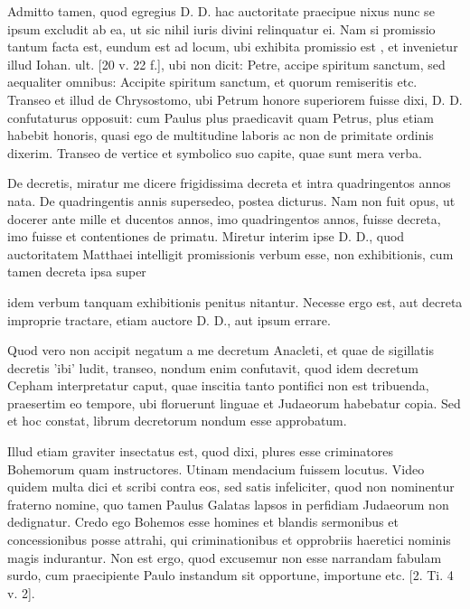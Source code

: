 Admitto tamen, quod egregius D. D. hac auctoritate praecipue nixus nunc se ipsum excludit ab ea, ut sic nihil iuris divini relinquatur ei. Nam si promissio tantum facta est, eundum est ad locum, ubi exhibita promissio est \marginpar{\small[287]}, et invenietur illud Iohan. ult. [20 v. 22 f.], ubi non dicit: Petre, accipe spiritum sanctum, sed aequaliter omnibus: Accipite spiritum sanctum, et quorum remiseritis etc. Transeo et illud de Chrysostomo, ubi Petrum honore superiorem fuisse dixi, D. D. confutaturus opposuit: cum Paulus plus praedicavit quam Petrus, plus etiam habebit honoris, quasi ego de multitudine laboris ac non de primitate ordinis dixerim. Transeo de vertice et symbolico suo capite, quae sunt mera verba.

De decretis, miratur me dicere frigidissima decreta et intra quadringentos annos nata. De quadringentis annis supersedeo, postea dicturus. Nam non fuit opus, ut docerer ante mille et ducentos annos, imo quadringentos annos, fuisse decreta, imo fuisse et contentiones de primatu. Miretur interim ipse D. D., quod auctoritatem Matthaei intelligit promissionis verbum esse, non exhibitionis, cum tamen decreta ipsa super

idem verbum tanquam exhibitionis penitus nitantur. Necesse ergo est, aut decreta improprie tractare, etiam auctore D. D., aut ipsum errare.

Quod vero non accipit negatum a me decretum Anacleti, et quae de sigillatis decretis 'ibi' ludit, transeo, nondum enim confutavit, quod idem decretum Cepham interpretatur caput, quae inscitia tanto pontifici non est tribuenda, praesertim eo tempore, ubi floruerunt linguae et Judaeorum habebatur copia. Sed et hoc constat, librum decretorum nondum esse approbatum.

Illud etiam graviter insectatus est, quod dixi, plures esse criminatores Bohemorum quam instructores. Utinam mendacium fuissem locutus. Video quidem multa dici et scribi contra eos, sed satis infeliciter, quod non nominentur fraterno nomine, quo tamen Paulus Galatas lapsos in perfidiam Judaeorum non dedignatur. Credo ego Bohemos esse homines et blandis sermonibus et concessionibus posse attrahi, qui criminationibus et opprobriis haeretici nominis magis indurantur. Non est ergo, quod excusemur non esse narrandam fabulam surdo, cum praecipiente Paulo instandum sit opportune, importune etc. [2. Ti. 4 v. 2].

